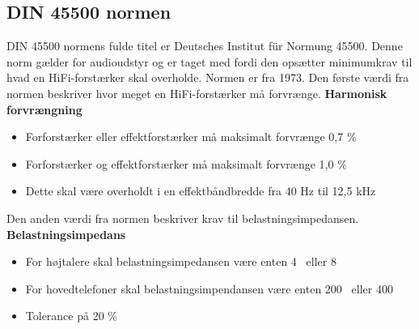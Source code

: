 \subsection*{DIN 45500 normen}
\label{DIN45500}
DIN 45500 normens fulde titel er Deutsches Institut f\"{u}r Normung 45500. Denne norm gælder for audioudstyr og er taget med fordi den opsætter minimumkrav til hvad en HiFi-forstærker skal overholde. Normen er fra 1973. \cite{DIN45500}%
\newline
\newline
Den første værdi fra normen beskriver hvor meget en HiFi-forstærker må forvrænge.
\newline
\newline
\textbf{Harmonisk forvrængning}
\begin{itemize}
\item Forforstærker eller effektforstærker må maksimalt forvrænge 0,7 \%
\item Forforstærker og effektforstærker må maksimalt forvrænge 1,0 \%
\item Dette skal være overholdt i en effektbåndbredde fra 40 Hz til 12,5 kHz
\end{itemize}
Den anden værdi fra normen beskriver krav til belastningsimpedansen.
\newline 
\newline
\textbf{Belastningsimpedans}
\begin{itemize}
\item For højtalere skal belastningsimpedansen være enten 4 \ohm~eller 8 \ohm
\item For hovedtelefoner skal belastningsimpendansen være enten 200 \ohm~eller 400 \ohm
\item Tolerance på 20 \%
\end{itemize}